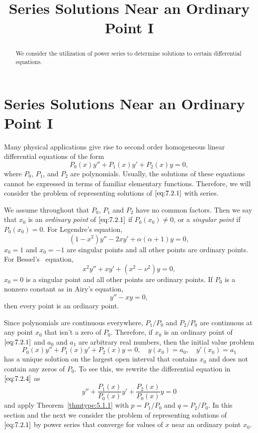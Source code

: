 \documentclass{ximera}
\title{Series Solutions Near an Ordinary Point I}%
\begin{document}
\begin{abstract}
We consider the utilization of power series to determine solutions to certain differential equations.
\end{abstract}

\maketitle

\section*{Series Solutions Near an Ordinary Point I}

Many physical applications give rise to second order homogeneous
linear  differential equations of the form
\begin{equation}\label{eq:7.2.1}
P_0(x)y''+P_1(x)y'+P_2(x)y=0,
\end{equation}
where $P_0$, $P_1$, and $P_2$ are polynomials. Usually, the solutions of these equations cannot be expressed in terms of familiar elementary functions. Therefore, we will consider the problem of representing
solutions of $\eqref{eq:7.2.1}$ with series.

We assume throughout that $P_0$, $P_1$ and $P_2$ have no common
factors. Then we say that $x_0$ is an \textit{ordinary point} of
$\eqref{eq:7.2.1}$ if $P_0(x_0)\neq0$, or a \textit{singular point} if
$P_0(x_0)=0$. For Legendre's equation,
\begin{equation}\label{eq:7.2.2}
(1-x^2)y''-2xy'+\alpha(\alpha+1)y=0,
\end{equation}
$x_0=1$ and $x_0=-1$ are singular points and all other points are
ordinary points. For  Bessel's~ equation,
$$
x^2y''+xy'+(x^2-\nu^2)y=0,
$$
$x_0=0$ is a singular point and all other points are ordinary points.
If $P_0$ is a nonzero constant as in  Airy's
equation,
\begin{equation}\label{eq:7.2.3}
y''-xy=0,
\end{equation}
then every point is an ordinary point.

Since polynomials are continuous everywhere, $P_1/P_0$ and $P_2/P_0$
are continuous at any point $x_0$ that isn't  a zero of $P_0$.
Therefore, if $x_0$ is an ordinary point of $\eqref{eq:7.2.1}$ and $a_0$ and
$a_1$ are arbitrary real numbers, then the initial value problem
\begin{equation}\label{eq:7.2.4}
P_0(x)y''+P_1(x)y'+P_2(x)y=0, \quad  y(x_0)=a_0,\quad y'(x_0)=a_1
\end{equation}
has a unique solution on the largest open interval that contains $x_0$
and does not contain any zeros of $P_0$. To see this, we rewrite the
differential equation in $\eqref{eq:7.2.4}$ as
$$
y''+\frac{P_1(x)}{P_0(x)}y'+\frac{P_2(x)}{P_0(x)}y=0
$$
and apply Theorem~\ref{thmtype:5.1.1} with $p=P_1/P_0$ and $q=P_2/P_0$.
In this section and the next we  consider the problem of
representing  solutions of $\eqref{eq:7.2.1}$ by power series that converge  for values of $x$  near an ordinary point $x_0$.
\end{document}
